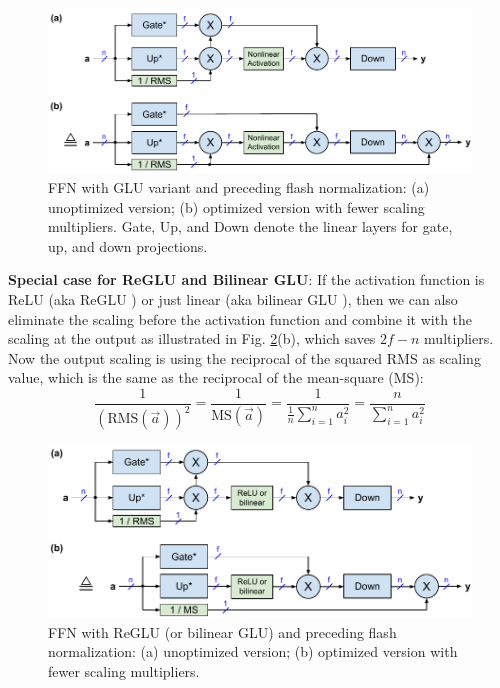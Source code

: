 \documentclass{article}
\numberwithin{equation}{section} %
\def\rms{\text{RMS}(\vec{a})}         %
\def\f1n{\frac{1}{n}}                 %
\def\sas{\sum_{i=1}^n a_i^2}          %
\def\a{\vec{a}}                       %
\begin{document}
\begin{figure}[h!] \centering
  \includegraphics[scale=0.9]{../doc/fig/flashNorm_fig3.pdf}
  \caption{FFN with GLU variant and preceding flash normalization: (a) unoptimized version; (b) optimized version with fewer scaling multipliers. Gate, Up, and Down denote the linear layers for gate, up, and down projections.}
\label{fig3} \end{figure}

\textbf{Special case for ReGLU and Bilinear GLU}: If the activation function is ReLU (aka ReGLU \citep{GLU}) or just linear (aka bilinear GLU \citep{GLU}), then we can also eliminate the scaling before the activation function and combine it with the scaling at the output as illustrated in Fig. \ref{fig4}(b), which saves $2f - n$ multipliers. Now the output scaling is using the reciprocal of the squared RMS as scaling value, which is the same as the reciprocal of the mean-square (MS):
\begin{equation*}
  \frac{1}{(\rms)^2} = \frac{1}{\text{MS}(\a)}
  = \frac{1}{\f1n \sas} = \frac{n}{\sas}
\end{equation*}

\begin{figure}[h!] \centering
  \includegraphics[scale=0.9]{../doc/fig/flashNorm_fig4.pdf}
  \caption{FFN with ReGLU (or bilinear GLU) and preceding flash normalization: (a) unoptimized version; (b) optimized version with fewer scaling multipliers.}
\label{fig4} \end{figure}
\end{document}
